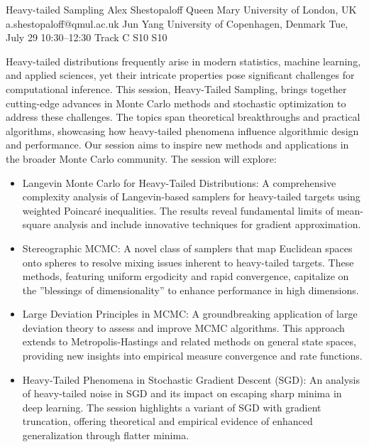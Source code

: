 \begin{talk}
  {Heavy-tailed Sampling}%
  {Alex Shestopaloff}%
  {Queen Mary University of London, UK}%
  {a.shestopaloff@qmul.ac.uk}%
  {Jun Yang}%
  {University of Copenhagen, Denmark}%
  {Tue, July 29 10:30–12:30 Track C}%
  {S10}%
  {S10}%

Heavy-tailed distributions frequently arise in modern statistics, machine learning, and applied sciences, yet their intricate properties pose significant challenges for computational inference. This session, Heavy-Tailed Sampling, brings together cutting-edge advances in Monte Carlo methods and stochastic optimization to address these challenges. The topics span theoretical breakthroughs and practical algorithms, showcasing how heavy-tailed phenomena influence algorithmic design and performance. Our session aims to inspire new methods and applications in the broader Monte Carlo community. The session will explore:
\begin{itemize}
    \item 
Langevin Monte Carlo for Heavy-Tailed Distributions: A comprehensive complexity analysis of Langevin-based samplers for heavy-tailed targets using weighted Poincaré inequalities. The results reveal fundamental limits of mean-square analysis and include innovative techniques for gradient approximation.
\item
Stereographic MCMC: A novel class of samplers that map Euclidean spaces onto spheres to resolve mixing issues inherent to heavy-tailed targets. These methods, featuring uniform ergodicity and rapid convergence, capitalize on the ''blessings of dimensionality'' to enhance performance in high dimensions.
\item
Large Deviation Principles in MCMC: A groundbreaking application of large deviation theory to assess and improve MCMC algorithms. This approach extends to Metropolis-Hastings and related methods on general state spaces, providing new insights into empirical measure convergence and rate functions.
\item 
Heavy-Tailed Phenomena in Stochastic Gradient Descent (SGD): An analysis of heavy-tailed noise in SGD and its impact on escaping sharp minima in deep learning. The session highlights a variant of SGD with gradient truncation, offering theoretical and empirical evidence of enhanced generalization through flatter minima.
\end{itemize}


\end{talk}

